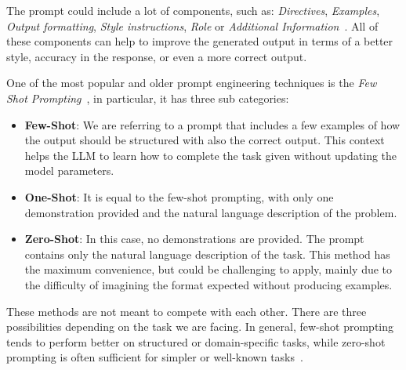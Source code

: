 \documentclass[12pt,a4paper,openright,twoside]{book}
\begin{document}
The prompt could include a lot of components, such as: \textit{Directives}, \textit{Examples}, \textit{Output formatting}, \textit{Style instructions}, \textit{Role} or \textit{Additional Information}~\cite{schuloff2024prompt_engineer}. All of these components can help to improve the generated output in terms of a better style, accuracy in the response, or even a more correct output.

One of the most popular and older prompt engineering techniques is the \textit{Few Shot Prompting}~\cite{brown2020languagemodelsfewshotlearners}, in particular, it has three sub categories:
\begin{itemize}
    \item \textbf{Few-Shot}: We are referring to a prompt that includes a few examples of how the output should be structured with also the correct output. This context helps the \ac{LLM} to learn how to complete the task given without updating the model parameters.
    \item \textbf{One-Shot}: It is equal to the few-shot prompting, with only one demonstration provided and the natural language description of the problem.  
    \item \textbf{Zero-Shot}: In this case, no demonstrations are provided. The prompt contains only the natural language description of the task. This method has the maximum convenience, but could be challenging to apply, mainly due to the difficulty of imagining the format expected without producing examples.
\end{itemize}
These methods are not meant to compete with each other.
There are three possibilities depending on the task we are facing.
In general, few-shot prompting tends to perform better on 
structured or domain-specific tasks, while zero-shot prompting is often sufficient for simpler or well-known tasks~\cite{brown2020languagemodelsfewshotlearners}.
\end{document}

